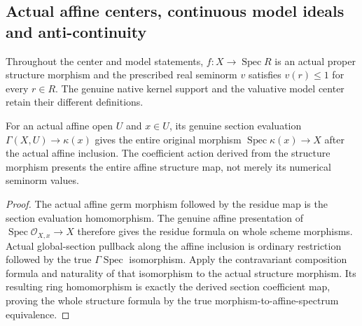 \subsection{Actual affine centers, continuous model ideals and anti-continuity}
\label{subsec:native-model-continuity}

Throughout the center and model statements, $f:X\to\operatorname{Spec}R$
is an actual proper structure morphism and the prescribed real seminorm
$v$ satisfies $v(r)\le1$ for every $r\in R$. The genuine native kernel
support and the valuative model center retain their different definitions.

\begin{theorem}
\label{scheme:affine-native-residue-structure-maps}
\leanok
{}
For an actual affine open $U$ and $x\in U$, its genuine section evaluation
$\Gamma(X,U)\to\kappa(x)$ gives the entire original morphism
$\operatorname{Spec}\kappa(x)\to X$ after the actual affine inclusion.
The coefficient action derived from the structure morphism presents the
entire affine structure map, not merely its numerical seminorm values.
\end{theorem}
\begin{proof}
The actual affine germ morphism followed by the residue map is the
section evaluation homomorphism. The genuine affine presentation of
$\operatorname{Spec}\mathcal O_{X,x}\to X$ therefore gives the residue
formula on whole scheme morphisms. Actual global-section pullback along
the affine inclusion is ordinary restriction followed by the true
$\Gamma\operatorname{Spec}$ isomorphism. Apply the contravariant
composition formula and naturality of that isomorphism to the actual
structure morphism. Its resulting ring homomorphism is exactly the
derived section coefficient map, proving the whole structure
formula by the true morphism-to-affine-spectrum equivalence.
\end{proof}

